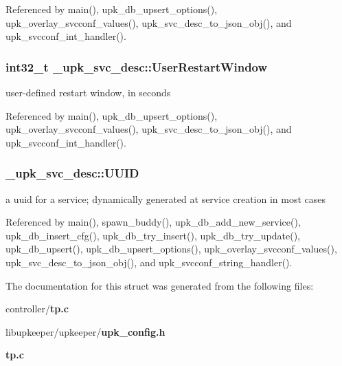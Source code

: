 Referenced by main(), upk\_\-db\_\-upsert\_\-options(), upk\_\-overlay\_\-svcconf\_\-values(), upk\_\-svc\_\-desc\_\-to\_\-json\_\-obj(), and upk\_\-svcconf\_\-int\_\-handler().

\subsubsection[{UserRestartWindow}]{\setlength{\rightskip}{0pt plus 5cm}int32\_\-t {\bf \_\-upk\_\-svc\_\-desc::UserRestartWindow}}\label{struct__upk__svc__desc_aa821e5cd2987061ed057f52fb61538a7}
user-\/defined restart window, in seconds 

Referenced by main(), upk\_\-db\_\-upsert\_\-options(), upk\_\-overlay\_\-svcconf\_\-values(), upk\_\-svc\_\-desc\_\-to\_\-json\_\-obj(), and upk\_\-svcconf\_\-int\_\-handler().

\subsubsection[{UUID}]{ {\bf \_\-upk\_\-svc\_\-desc::UUID}}\label{struct__upk__svc__desc_a8f7f1940251c598ea87a72c6ca1fd5cd}
a uuid for a service; dynamically generated at service creation in most cases 

Referenced by main(), spawn\_\-buddy(), upk\_\-db\_\-add\_\-new\_\-service(), upk\_\-db\_\-insert\_\-cfg(), upk\_\-db\_\-try\_\-insert(), upk\_\-db\_\-try\_\-update(), upk\_\-db\_\-upsert(), upk\_\-db\_\-upsert\_\-options(), upk\_\-overlay\_\-svcconf\_\-values(), upk\_\-svc\_\-desc\_\-to\_\-json\_\-obj(), and upk\_\-svcconf\_\-string\_\-handler().



The documentation for this struct was generated from the following files:\begin{DoxyCompactItemize}
\item 
controller/{\bf tp.c}\item 
libupkeeper/upkeeper/{\bf upk\_\-config.h}\item 
{\bf tp.c}\end{DoxyCompactItemize}
